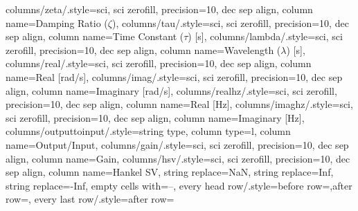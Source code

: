 {columns/zeta/.style={sci, sci zerofill, precision=10, dec sep align, column name={Damping Ratio ($\zeta$)}},
columns/tau/.style={sci, sci zerofill, precision=10, dec sep align, column name={Time Constant ($\tau$) [s]}},
columns/lambda/.style={sci, sci zerofill, precision=10, dec sep align, column name={Wavelength ($\lambda$) [s]}},
columns/real/.style={sci, sci zerofill, precision=10, dec sep align, column name={Real [rad/s]}},
columns/imag/.style={sci, sci zerofill, precision=10, dec sep align, column name={Imaginary [rad/s]}},
columns/realhz/.style={sci, sci zerofill, precision=10, dec sep align, column name={Real [Hz]}},
columns/imaghz/.style={sci, sci zerofill, precision=10, dec sep align, column name={Imaginary [Hz]}},
columns/outputtoinput/.style={string type, column type=l, column name={Output/Input}},
columns/gain/.style={sci, sci zerofill, precision=10, dec sep align, column name={Gain}},
columns/hsv/.style={sci, sci zerofill, precision=10, dec sep align, column name={Hankel SV}},
string replace={NaN}{},
string replace={Inf}{},
string replace={-Inf}{},
empty cells with={--},
every head row/.style={before row=\toprule,after row=\midrule},
every last row/.style={after row=\bottomrule}}
